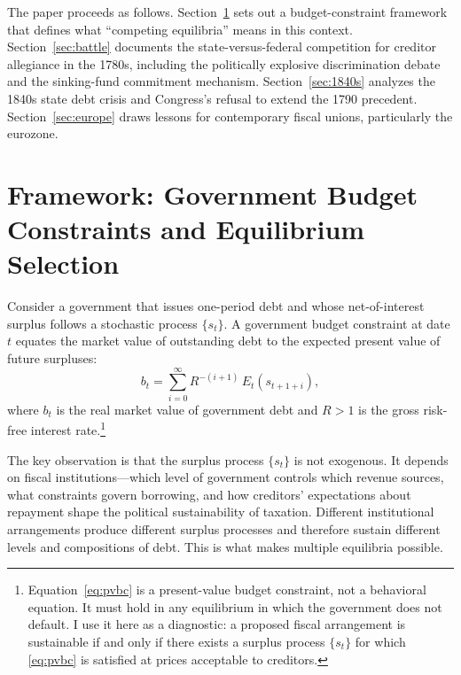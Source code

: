 \documentclass[12pt]{article}
\begin{document}
The paper proceeds as follows. Section~\ref{sec:framework} sets out a
budget-constraint framework that defines what ``competing equilibria''
means in this context. Section~\ref{sec:battle} documents the
state-versus-federal competition for creditor allegiance in the 1780s,
including the politically explosive discrimination debate and the
sinking-fund commitment mechanism. Section~\ref{sec:1840s} analyzes the
1840s state debt crisis and Congress's refusal to extend the 1790
precedent. Section~\ref{sec:europe} draws lessons for contemporary
fiscal unions, particularly the eurozone.


\section{Framework: Government Budget Constraints and Equilibrium
Selection}
\label{sec:framework}

Consider a government that issues one-period debt and whose net-of-interest
surplus follows a stochastic process $\{s_t\}$. A government budget
constraint at date $t$ equates the market value of outstanding debt to
the expected present value of future surpluses:
\begin{equation}
\label{eq:pvbc}
b_t = \sum_{i=0}^{\infty} R^{-(i+1)}\, E_t\!\left(s_{t+1+i}\right),
\end{equation}
where $b_t$ is the real market value of government debt and $R > 1$ is
the gross risk-free interest rate.\footnote{Equation~\eqref{eq:pvbc} is
a present-value budget constraint, not a behavioral equation. It must
hold in any equilibrium in which the government does not default. I use
it here as a diagnostic: a proposed fiscal arrangement is sustainable if
and only if there exists a surplus process $\{s_t\}$ for which
\eqref{eq:pvbc} is satisfied at prices acceptable to creditors.}

The key observation is that the surplus process $\{s_t\}$ is not
exogenous. It depends on fiscal institutions---which level of government
controls which revenue sources, what constraints govern borrowing, and
how creditors' expectations about repayment shape the political
sustainability of taxation. Different institutional arrangements produce
different surplus processes and therefore sustain different levels and
compositions of debt. This is what makes multiple equilibria possible.
\end{document}
